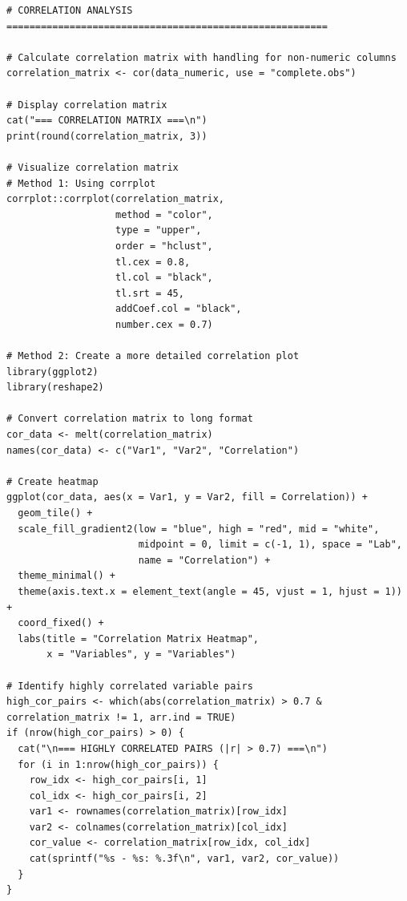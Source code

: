 \begin{lstlisting}[caption={Phân tích tương quan giữa các biến}]
# CORRELATION ANALYSIS ========================================================

# Calculate correlation matrix with handling for non-numeric columns
correlation_matrix <- cor(data_numeric, use = "complete.obs")

# Display correlation matrix
cat("=== CORRELATION MATRIX ===\n")
print(round(correlation_matrix, 3))

# Visualize correlation matrix
# Method 1: Using corrplot
corrplot::corrplot(correlation_matrix, 
                   method = "color",
                   type = "upper",
                   order = "hclust",
                   tl.cex = 0.8,
                   tl.col = "black",
                   tl.srt = 45,
                   addCoef.col = "black",
                   number.cex = 0.7)

# Method 2: Create a more detailed correlation plot
library(ggplot2)
library(reshape2)

# Convert correlation matrix to long format
cor_data <- melt(correlation_matrix)
names(cor_data) <- c("Var1", "Var2", "Correlation")

# Create heatmap
ggplot(cor_data, aes(x = Var1, y = Var2, fill = Correlation)) +
  geom_tile() +
  scale_fill_gradient2(low = "blue", high = "red", mid = "white", 
                       midpoint = 0, limit = c(-1, 1), space = "Lab",
                       name = "Correlation") +
  theme_minimal() +
  theme(axis.text.x = element_text(angle = 45, vjust = 1, hjust = 1)) +
  coord_fixed() +
  labs(title = "Correlation Matrix Heatmap",
       x = "Variables", y = "Variables")

# Identify highly correlated variable pairs
high_cor_pairs <- which(abs(correlation_matrix) > 0.7 & correlation_matrix != 1, arr.ind = TRUE)
if (nrow(high_cor_pairs) > 0) {
  cat("\n=== HIGHLY CORRELATED PAIRS (|r| > 0.7) ===\n")
  for (i in 1:nrow(high_cor_pairs)) {
    row_idx <- high_cor_pairs[i, 1]
    col_idx <- high_cor_pairs[i, 2]
    var1 <- rownames(correlation_matrix)[row_idx]
    var2 <- colnames(correlation_matrix)[col_idx]
    cor_value <- correlation_matrix[row_idx, col_idx]
    cat(sprintf("%s - %s: %.3f\n", var1, var2, cor_value))
  }
}
\end{lstlisting}

